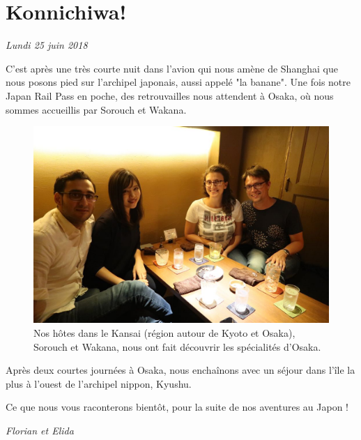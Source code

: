 \section{Konnichiwa!}

\emph{Lundi 25 juin 2018}

C'est après une très courte nuit dans l'avion qui nous amène de Shanghai
que nous posons pied sur l'archipel japonais, aussi appelé "la banane".
Une fois notre Japan Rail Pass en poche, des retrouvailles nous
attendent à Osaka, où nous sommes accueillis par Sorouch et Wakana.

\begin{figure}
\centering
\includegraphics{images/20180625_osaka.JPG}
\caption{Nos hôtes dans le Kansai (région autour de Kyoto et Osaka),
Sorouch et Wakana, nous ont fait découvrir les spécialités d'Osaka.}
\end{figure}

Après deux courtes journées à Osaka, nous enchaînons avec un séjour dans
l'île la plus à l'ouest de l'archipel nippon, Kyushu.

Ce que nous vous raconterons bientôt, pour la suite de nos aventures au
Japon !

\emph{Florian et Elida}

